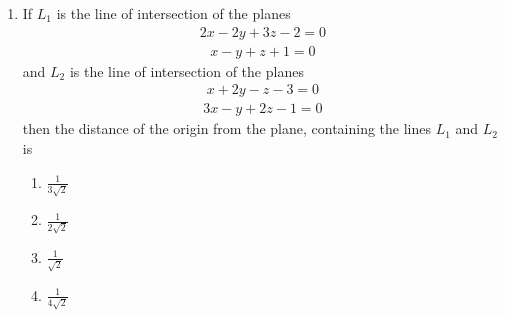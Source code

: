 \begin{enumerate}[label=\arabic*.,ref=\thesubsection.\theenumi]
\item If $L_1$ is the line of intersection of the planes
\begin{align*}
2x - 2y + 3z - 2 = 0
\end{align*}
\begin{align*}
x - y + z + 1 = 0
\end{align*}
and $L_2$ is the line of intersection of the planes
\begin{align*}
x + 2y - z - 3 = 0
\end{align*}
\begin{align*}
3x -y + 2z - 1 = 0
\end{align*}
then the distance of the origin from the plane, containing the lines $L_1$ and $L_2$ is
\begin{enumerate}
\item $\frac{1}{3\sqrt{2}}$
\item $\frac{1}{2\sqrt{2}}$
\item $\frac{1}{\sqrt{2}}$
\item $\frac{1}{4\sqrt{2}}$
\end{enumerate}
\end{enumerate}





































